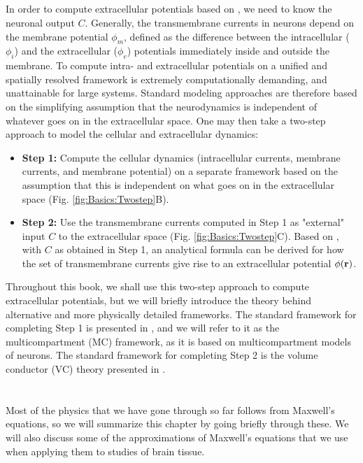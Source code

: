 \subsection{}
\label{sec:Basics:twostep}
In order to compute extracellular potentials based on , we need to know the neuronal output $C$. Generally, the transmembrane currents in neurons depend on the membrane potential $\phi_m$, defined as the difference between the intracellular ($\phi_i$) and the extracellular ($\phi_e$) potentials immediately inside and outside the membrane. To compute intra- and extracellular potentials on a unified and spatially resolved framework is extremely computationally demanding, and unattainable for large systems. Standard modeling approaches are therefore based on the simplifying assumption that the neurodynamics is independent of whatever goes on in the extracellular space. One may then take a two-step approach to model the cellular and extracellular dynamics: 

\begin{itemize}
\item {\bf Step 1:} Compute the cellular dynamics (intracellular currents, membrane currents, and membrane potential) on a separate framework based on the assumption that this is independent on what goes on in the extracellular space (Fig. \ref{fig:Basics:Twostep}B). 

\item {\bf Step 2:} Use the transmembrane currents computed in Step 1 as "external" input $C$ to the extracellular space (Fig. \ref{fig:Basics:Twostep}C). Based on , with $C$ as obtained in Step 1, an analytical formula can be derived for how the set of transmembrane currents give rise to an extracellular potential $\phi({\bf r})$. 
\end{itemize}

Throughout this book, we shall use this two-step approach to compute extracellular potentials, but we will briefly introduce the theory behind alternative and more physically detailed frameworks. The standard framework for completing Step 1 is presented in , and we will refer to it as the multicompartment (MC) framework, as it is based on multicompartment models of neurons. The standard framework for completing Step 2 is the volume conductor (VC) theory presented in  . 


\section{}
\label{sec:Basics:Maxwell} 
Most of the physics that we have gone through so far follows from Maxwell's equations, so we will summarize this chapter by going briefly through these. We will also discuss some of the approximations of Maxwell's equations that we use when applying them to studies of brain tissue. 

